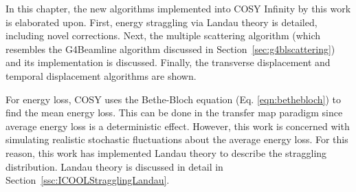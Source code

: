 
In this chapter, the new algorithms implemented into COSY Infinity by this work is elaborated upon. First, energy straggling via Landau theory is detailed, including novel corrections. Next, the multiple scattering algorithm (which resembles the G4Beamline algorithm discussed in Section~\ref{sec:g4blscattering}) and its implementation is discussed. Finally, the transverse displacement and temporal displacement algorithms are shown.

 \label{sec:COSYStraggling}\par
For energy loss, COSY uses the Bethe-Bloch equation (Eq. \eqref{eqn:bethebloch}) to find the mean energy loss. This can be done in the transfer map paradigm since average energy loss is a deterministic effect. However, this work is concerned with simulating realistic stochastic fluctuations about the average energy loss. For this reason, this work has implemented Landau theory \cite{landau} to describe the straggling distribution. Landau theory is discussed in detail in Section~\ref{ssc:ICOOLStragglingLandau}. 

